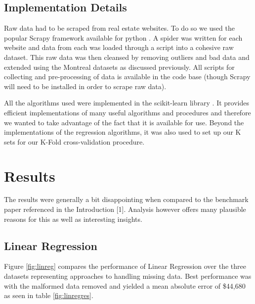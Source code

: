\documentclass{acm_proc_article-sp}
\begin{document}
\subsection{Implementation Details}
	Raw data had to be scraped from real estate websites. To do so we used the popular Scrapy framework available for python \cite{scrapy}. A spider was written for each website and data from each was loaded through a script into a cohesive raw dataset. This raw data was then cleansed by removing outliers and bad data and extended using the Montreal datasets as discussed previously. All scripts for collecting and pre-processing of data is available in the code base (though Scrapy will need to be installed in order to scrape raw data).
	
	All the algorithms used were implemented in the scikit-learn library \cite{scikit}. It provides efficient implementations of many useful algorithms and procedures and therefore we wanted to take advantage of the fact that it is available for use. Beyond the implementations of the regression algorithms, it was also used to set up our K sets for our K-Fold cross-validation procedure. 

\section{Results}
	 The results were generally a bit disappointing when compared to the benchmark paper referenced in the Introduction [1]. Analysis however offers many plausible reasons for this as well as interesting insights. 
	 
\subsection{Linear Regression}
	Figure \ref{fig:linreg} compares the performance of Linear Regression over the three datasets representing approaches to handling missing data. Best performance was with the malformed data removed and yielded a mean absolute error of \$44,680 as seen in table \ref{fig:linregres}.
\end{document}
